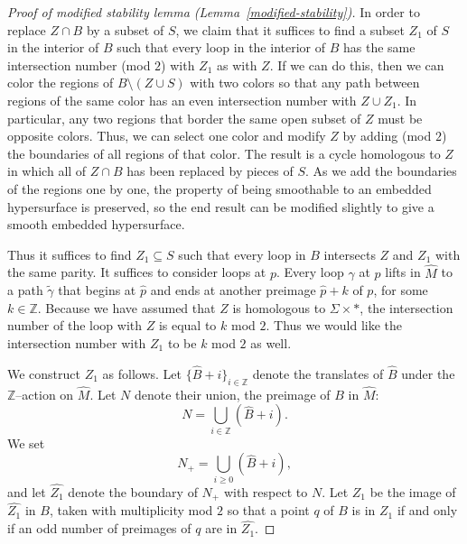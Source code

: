 \documentclass[12pt]{amsart}
\numberwithin{equation}{section}
\begin{document}
\begin{proof}[Proof of modified stability lemma (Lemma~\ref{modified-stability})]
In order to replace $Z \cap B$ by a subset of $S$, we claim that it suffices to find a subset $Z_1$ of $S$ in the interior of $B$ such that every loop in the interior of $B$ has the same intersection number (mod $2$) with $Z_1$ as with $Z$.  If we can do this, then we can color the regions of $B \setminus (Z \cup S)$ with two colors so that any path between regions of the same color has an even intersection number with $Z \cup Z_1$.  In particular, any two regions that border the same open subset of $Z$ must be opposite colors.  Thus, we can select one color and modify $Z$ by adding (mod $2$) the boundaries of all regions of that color.  The result is a cycle homologous to $Z$ in which all of $Z \cap B$ has been replaced by pieces of $S$.  As we add the boundaries of the regions one by one, the property of being smoothable to an embedded hypersurface is preserved, so the end result can be modified slightly to give a smooth embedded hypersurface.

Thus it suffices to find $Z_1 \subseteq S$ such that every loop in $B$ intersects $Z$ and $Z_1$ with the same parity.  It suffices to consider loops at $p$.  Every loop $\gamma$ at $p$ lifts in $\widehat{M}$ to a path $\widetilde{\gamma}$ that begins at $\widehat{p}$ and ends at another preimage $\widehat{p} + k$ of $p$, for some $k \in \mathbb{Z}$.  Because we have assumed that $Z$ is homologous to $\Sigma \times \ast$, the intersection number of the loop with $Z$ is equal to $k$ mod $2$.  Thus we would like the intersection number with $Z_1$ to be $k$ mod $2$ as well.

We construct $Z_1$ as follows.  Let $\{\widehat{B} + i\}_{i \in \mathbb{Z}}$ denote the translates of $\widehat{B}$ under the $\mathbb{Z}$--action on $\widehat{M}$.  Let $N$ denote their union, the preimage of $B$ in $\widehat{M}$:
\[N = \bigcup_{i \in \mathbb{Z}} (\widehat{B} + i).\]
We set
\[N_+ = \bigcup_{i \geq 0} (\widehat{B} + i),\]
and let $\widehat{Z_1}$ denote the boundary of $N_+$ with respect to $N$.  Let $Z_1$ be the image of $\widehat{Z_1}$ in $B$, taken with multiplicity mod $2$ so that a point $q$ of $B$ is in $Z_1$ if and only if an odd number of preimages of $q$ are in $\widehat{Z_1}$.


\end{proof}
\end{document}
